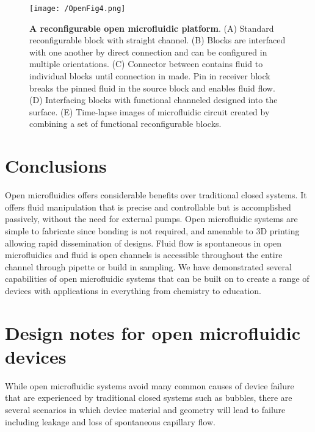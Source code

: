 \begin{figure}[h!] %
\centering
\texttt{[image: /OpenFig4.png]}
\caption[\textbf{A reconfigurable open microfluidic platform}]{\textbf{A reconfigurable open microfluidic platform}. (A) Standard reconfigurable block with straight channel. (B) Blocks are interfaced with one another by direct connection and can be configured in multiple orientations. (C) Connector between contains fluid to individual blocks until connection in made. Pin in receiver block breaks the pinned fluid in the source block and enables fluid flow. (D) Interfacing blocks with functional channeled designed into the surface. (E) Time-lapse images of microfluidic circuit created by combining a set of functional reconfigurable blocks.}
\label{figure:Fig4}
\end{figure}

\section{Conclusions}
Open microfluidics offers considerable benefits over traditional closed systems. It offers fluid manipulation that is precise and controllable but is accomplished passively, without the need for external pumps. Open microfluidic systems are simple to fabricate since bonding is not required, and amenable to 3D printing allowing rapid dissemination of designs. Fluid flow is spontaneous in open microfluidics and fluid is open channels is accessible throughout the entire channel through pipette or build in sampling. We have demonstrated several capabilities of open microfluidic systems that can be built on to create a range of devices with applications in everything from chemistry to education. 

\section{Design notes for open microfluidic devices}
While open microfluidic systems avoid many common causes of device failure that are experienced by traditional closed systems such as bubbles, there are several scenarios in which device material and geometry will lead to failure including leakage and loss of spontaneous capillary flow.

